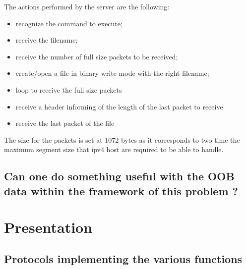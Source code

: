 \documentclass{article}
\begin{document}
The actions performed by the server are the following:
\begin{itemize}
    \item recognize the command to execute;
    \item receive the filename;
    \item receive the number of full size packets to be received;
    \item create/open a file in binary write mode with the right filename;
    \item loop to receive the full size packets
    \item receive a header informing of the length of the last packet to receive
    \item receive the last packet of the file
\end{itemize}

The size for the packets is set at 1072 bytes as it corresponds to two time the maximum segment size that ipv4 host are required to be able to handle.

\subsection{Can one do something useful with the OOB data within the framework of this problem ?}

\section{Presentation}
\subsection{Protocols implementing the various functions}
\end{document}
